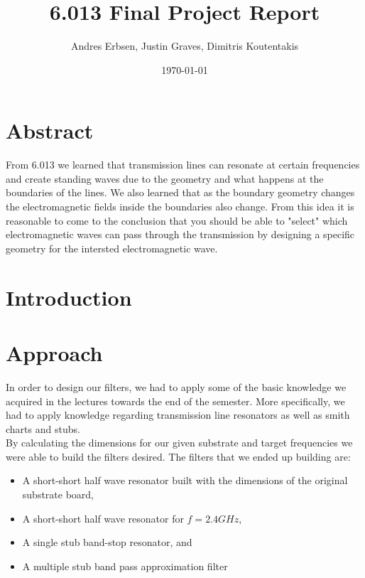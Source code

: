 \documentclass[letterpaper, 12pt]{article}
\begin{document}
\title{6.013 Final Project Report}
\author{Andres Erbsen, Justin Graves, Dimitris Koutentakis}
\date{\today}
\maketitle
\vspace{5mm}
\section{Abstract}
From 6.013 we learned that transmission lines can resonate at certain frequencies and create standing waves due to the geometry and what happens at the boundaries of the lines. We also learned that as the boundary geometry changes the electromagnetic fields inside the boundaries also change. From this idea it is reasonable to come to the conclusion that you should be able to "select" which electromagnetic waves can pass through the transmission by designing a specific geometry for the intersted electromagnetic wave.

\section {Introduction}
\section{Approach}
In order to design our filters, we had to apply some of the basic knowledge we acquired in the lectures towards the end of the semester. More specifically, we had to apply knowledge regarding transmission line resonators as well as smith charts and stubs.
\\
By calculating the dimensions for our given substrate and target frequencies we were able to build the filters desired. The filters that we ended up building are:
\begin{itemize}
    \item A short-short half wave resonator built with the dimensions of the original substrate board,
    \item A short-short half wave resonator for $f=2.4 GHz$,
    \item A single stub band-stop resonator, and
    \item A multiple stub band pass approximation filter
\end{itemize}
\end{document}
